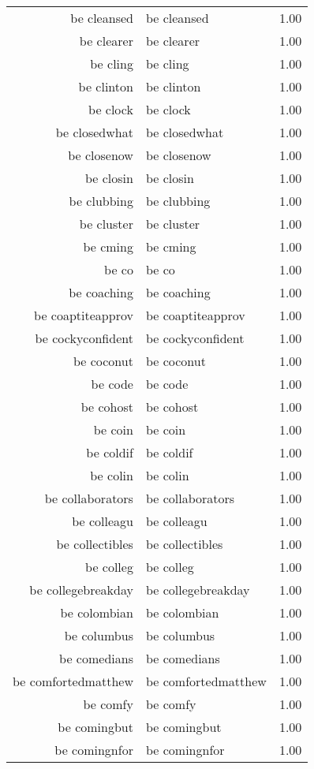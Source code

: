 \begin{table}[ht]
\begin{tabular}{rlr}
  be cleansed & be cleansed & 1.00 \\ 
  be clearer & be clearer & 1.00 \\ 
  be cling & be cling & 1.00 \\ 
  be clinton & be clinton & 1.00 \\ 
  be clock & be clock & 1.00 \\ 
  be closedwhat & be closedwhat & 1.00 \\ 
  be closenow & be closenow & 1.00 \\ 
  be closin & be closin & 1.00 \\ 
  be clubbing & be clubbing & 1.00 \\ 
  be cluster & be cluster & 1.00 \\ 
  be cming & be cming & 1.00 \\ 
  be co & be co & 1.00 \\ 
  be coaching & be coaching & 1.00 \\ 
  be coaptiteapprov & be coaptiteapprov & 1.00 \\ 
  be cockyconfident & be cockyconfident & 1.00 \\ 
  be coconut & be coconut & 1.00 \\ 
  be code & be code & 1.00 \\ 
  be cohost & be cohost & 1.00 \\ 
  be coin & be coin & 1.00 \\ 
  be coldif & be coldif & 1.00 \\ 
  be colin & be colin & 1.00 \\ 
  be collaborators & be collaborators & 1.00 \\ 
  be colleagu & be colleagu & 1.00 \\ 
  be collectibles & be collectibles & 1.00 \\ 
  be colleg & be colleg & 1.00 \\ 
  be collegebreakday & be collegebreakday & 1.00 \\ 
  be colombian & be colombian & 1.00 \\ 
  be columbus & be columbus & 1.00 \\ 
  be comedians & be comedians & 1.00 \\ 
  be comfortedmatthew & be comfortedmatthew & 1.00 \\ 
  be comfy & be comfy & 1.00 \\ 
  be comingbut & be comingbut & 1.00 \\ 
  be comingnfor & be comingnfor & 1.00 \\ 

\end{tabular}
\end{table}
